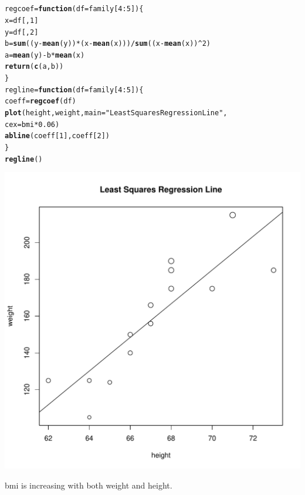 \documentclass[11pt]{article}\usepackage[]{graphicx}\usepackage[]{color}
\makeatletter
\def\maxwidth{ %
  \ifdim\Gin@nat@width>\linewidth
    \linewidth
  \else
    \Gin@nat@width
  \fi
}
\newcommand{\hlnum}[1]{\textcolor[rgb]{0.686,0.059,0.569}{#1}}%
\newcommand{\hlstr}[1]{\textcolor[rgb]{0.192,0.494,0.8}{#1}}%
\newcommand{\hlopt}[1]{\textcolor[rgb]{0,0,0}{#1}}%
\newcommand{\hlstd}[1]{\textcolor[rgb]{0.345,0.345,0.345}{#1}}%
\newcommand{\hlkwa}[1]{\textcolor[rgb]{0.161,0.373,0.58}{\textbf{#1}}}%
\newcommand{\hlkwb}[1]{\textcolor[rgb]{0.69,0.353,0.396}{#1}}%
\newcommand{\hlkwc}[1]{\textcolor[rgb]{0.333,0.667,0.333}{#1}}%
\newcommand{\hlkwd}[1]{\textcolor[rgb]{0.737,0.353,0.396}{\textbf{#1}}}%
\newenvironment{kframe}{%
 \def\at@end@of@kframe{}%
 \ifinner\ifhmode%
  \def\at@end@of@kframe{\end{minipage}}%
  \begin{minipage}{\columnwidth}%
 \fi\fi%
 \def\FrameCommand##1{\hskip\@totalleftmargin \hskip-\fboxsep
 \colorbox{shadecolor}{##1}\hskip-\fboxsep
     \hskip-\linewidth \hskip-\@totalleftmargin \hskip\columnwidth}%
 \MakeFramed {\advance\hsize-\width
   \@totalleftmargin\z@ \linewidth\hsize
   \@setminipage}}%
 {\par\unskip\endMakeFramed%
 \at@end@of@kframe}
\newenvironment{knitrout}{}{} %
\makeatother
\begin{document}
\section{} 
\begin{knitrout}
\color{fgcolor}\begin{kframe}
\begin{alltt}
\hlstd{regcoef} \hlkwb{=} \hlkwa{function}\hlstd{(}\hlkwc{df}\hlstd{=family[}\hlnum{4}\hlopt{:}\hlnum{5}\hlstd{])\{}
  \hlstd{x} \hlkwb{=} \hlstd{df[,}\hlnum{1}\hlstd{]}
  \hlstd{y} \hlkwb{=} \hlstd{df[,}\hlnum{2}\hlstd{]}
  \hlstd{b} \hlkwb{=} \hlkwd{sum}\hlstd{((y}\hlopt{-}\hlkwd{mean}\hlstd{(y))}\hlopt{*}\hlstd{(x}\hlopt{-}\hlkwd{mean}\hlstd{(x)))}\hlopt{/}\hlkwd{sum}\hlstd{((x}\hlopt{-}\hlkwd{mean}\hlstd{(x))}\hlopt{^}\hlnum{2}\hlstd{)}
  \hlstd{a} \hlkwb{=} \hlkwd{mean}\hlstd{(y)} \hlopt{-} \hlstd{b}\hlopt{*}\hlkwd{mean}\hlstd{(x)}
  \hlkwd{return}\hlstd{(}\hlkwd{c}\hlstd{(a,b))}
\hlstd{\}}
\hlstd{regline} \hlkwb{=} \hlkwa{function}\hlstd{(}\hlkwc{df}\hlstd{=family[}\hlnum{4}\hlopt{:}\hlnum{5}\hlstd{])\{}
  \hlstd{coeff} \hlkwb{=} \hlkwd{regcoef}\hlstd{(df)}
  \hlkwd{plot}\hlstd{(height,weight,} \hlkwc{main} \hlstd{=} \hlstr{"Least Squares Regression Line"}\hlstd{,}
       \hlkwc{cex} \hlstd{= bmi}\hlopt{*}\hlnum{0.06}\hlstd{)}
  \hlkwd{abline}\hlstd{(coeff[}\hlnum{1}\hlstd{],coeff[}\hlnum{2}\hlstd{])}
\hlstd{\}}
\hlkwd{regline}\hlstd{()}
\end{alltt}
\end{kframe}
\includegraphics[width=\maxwidth]{figure/unnamed-chunk-3-1} 

\end{knitrout}
bmi is increasing with both weight and height.
\end{document}
